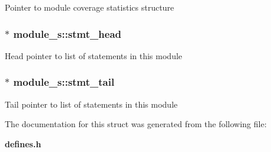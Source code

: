 Pointer to module coverage statistics structure 
\subsubsection{$\ast$ module\_\-s::stmt\_\-head}\label{structmodule__s_m7}


Head pointer to list of statements in this module 
\subsubsection{$\ast$ module\_\-s::stmt\_\-tail}\label{structmodule__s_m8}


Tail pointer to list of statements in this module 

The documentation for this struct was generated from the following file:\begin{CompactItemize}
\item 
{\bf defines.h}\end{CompactItemize}
